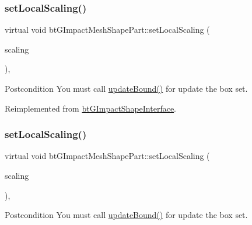 \subsubsection{\texorpdfstring{set\+Local\+Scaling()}{setLocalScaling()}\hspace{0.1cm}{\footnotesize\ttfamily [1/2]}}
{\footnotesize\ttfamily virtual void bt\+G\+Impact\+Mesh\+Shape\+Part\+::set\+Local\+Scaling (\begin{DoxyParamCaption}\item[{const bt\+Vector3 \&}]{scaling }\end{DoxyParamCaption})\hspace{0.3cm}{\ttfamily [inline]}, {\ttfamily [virtual]}}

\begin{DoxyPostcond}{Postcondition}
You must call \hyperlink{classbtGImpactShapeInterface_acb26c2d7a2aecabd06b996b72b848492}{update\+Bound()} for update the box set. 
\end{DoxyPostcond}


Reimplemented from \hyperlink{classbtGImpactShapeInterface_adec0bd43cd0105b1d0dc172bc7db50d8}{bt\+G\+Impact\+Shape\+Interface}.

\mbox{\label{classbtGImpactMeshShapePart_a2c1de297d020a75e1ab0f10f7c71478f}} 
\subsubsection{\texorpdfstring{set\+Local\+Scaling()}{setLocalScaling()}\hspace{0.1cm}{\footnotesize\ttfamily [2/2]}}
{\footnotesize\ttfamily virtual void bt\+G\+Impact\+Mesh\+Shape\+Part\+::set\+Local\+Scaling (\begin{DoxyParamCaption}\item[{const bt\+Vector3 \&}]{scaling }\end{DoxyParamCaption})\hspace{0.3cm}{\ttfamily [inline]}, {\ttfamily [virtual]}}

\begin{DoxyPostcond}{Postcondition}
You must call \hyperlink{classbtGImpactShapeInterface_acb26c2d7a2aecabd06b996b72b848492}{update\+Bound()} for update the box set. 
\end{DoxyPostcond}


